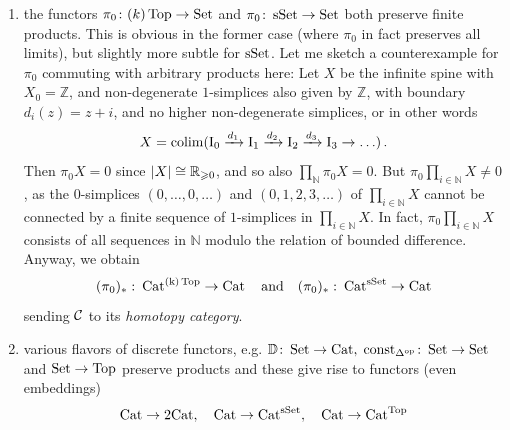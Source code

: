 \begin{enumerate}[label=\roman*)]
                \begin{equation*}
                    \gr{\cdot} \,\colon \sSet \leftrightarrows \kTop
                \end{equation*}
                and any $(\sSet. \times)$-enriched category gives a $(\kTop, \times)$-enriched one and conversely.
            \item 
                the functors $\pi_0 \colon (k)\operatorname{Top} \to \operatorname{Set}$ and $\pi_0 \colon \operatorname{sSet} \to \operatorname{Set}$ both preserve finite products. This is obvious in the former case (where $\pi_0$ in fact preserves all limits), but slightly more subtle for $\operatorname{sSet}$. Let me sketch a counterexample for $\pi_0$ commuting with arbitrary products here: Let $X$ be the infinite spine with $X_0 = \mathbb{Z}$, and non-degenerate $1$-simplices also given by $\mathbb{Z}$, with boundary $d_i(z) = z + i$, and no higher non-degenerate simplices, or in other words
                \begin{equation*}
                    X = \operatorname*{colim}(\mathrm{I}_0 \xrightarrow{d_1} \mathrm{I}_1 \xrightarrow{d_2} \mathrm{I}_2 \xrightarrow{d_3} \mathrm{I}_3 \rightarrow \ldots) \,.
                \end{equation*}
                Then $\pi_0 X = 0$ since $\left| X \right| \cong \mathbb{R}           _{\geqslant 0}$, and so also $\prod\limits_{\mathbb{N}} \pi_0 X = 0$. But $\pi_0 \prod\limits_{i \in \mathbb{N}} X \neq 0$, as the $0$-simplices $(0, \ldots, 0, \ldots)$ and $(0,1,2,3, \ldots)$ of $\prod\limits_{i \in \mathbb{N}}X$ cannot be connected by a finite sequence of $1$-simplices in $\prod\limits_{i \in \mathbb{N}}X$. In fact, $\pi_0 \prod\limits_{i \in \mathbb{N}}X$ consists of all sequences in $\mathbb{N}$ modulo the relation of bounded difference. Anyway, we obtain
                \begin{equation*}
                    (\pi_0)_{*} \,\colon \operatorname{Cat}^{\text{(k)}\operatorname{Top}} \to \operatorname{Cat} \quad \text{and} \quad (\pi_0)_{*} \,\colon \operatorname{Cat}^{\operatorname{sSet}} \to \operatorname{Cat}
                \end{equation*}
                sending $\mathcal{C}$ to its \emph{homotopy category}.
            \item 
                various flavors of discrete functors, e.g. $\mathbb{D} \colon \operatorname{Set} \to \operatorname{Cat}, \; \operatorname{const}_{\Delta^{\operatorname{op}}} \colon \operatorname{Set} \to \operatorname{Set}$ and $\operatorname{Set} \to \operatorname{Top}$ preserve products and these give rise to functors (even embeddings)
                \begin{equation*}
                    \operatorname{Cat} \to \mathrm{2Cat}, \quad \operatorname{Cat} \to \operatorname{Cat}^{\operatorname{sSet}}, \quad \operatorname{Cat} \to \operatorname{Cat}^{\operatorname{Top}}
                \end{equation*}

\end{enumerate}
